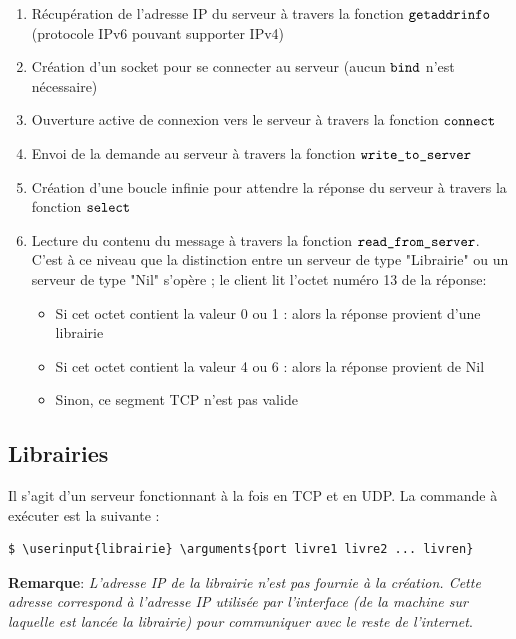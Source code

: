 \documentclass[
  french,
  twocolumn,
	9pt, %
]{fphw}
\newcommand\userinput[1]{\textbf{#1}}
\newcommand\arguments[1]{\textit{#1}}
\begin{document}
\begin{enumerate}
  \item Récupération de l'adresse IP du serveur à travers la fonction $\verb|getaddrinfo|$ (protocole IPv6 pouvant supporter IPv4)
  \item Création d'un socket pour se connecter au serveur (aucun $\verb|bind|$ n'est nécessaire) 
  \item Ouverture active de connexion vers le serveur à travers la fonction $\verb|connect|$
  \item Envoi de la demande au serveur à travers la fonction $\verb|write_to_server|$
  \item Création d'une boucle infinie pour attendre la réponse du serveur à travers la fonction $\verb|select|$
  \item Lecture du contenu du message à travers la fonction $\verb|read_from_server|$. C'est à ce niveau que la distinction entre un serveur de type "Librairie" ou un serveur de type "Nil" s'opère ; le client lit l'octet numéro 13 de la réponse:
  \begin{itemize}
    \item Si cet octet contient la valeur 0 ou 1 : alors la réponse provient d'une librairie
    \item Si cet octet contient la valeur 4 ou 6 : alors la réponse provient de Nil
    \item Sinon, ce segment TCP n'est pas valide
  \end{itemize}
\end{enumerate}


\subsection{Librairies}

Il s'agit d'un serveur fonctionnant à la fois en TCP et en UDP. La commande à exécuter est la suivante :
\begin{Verbatim}[commandchars=\\\{\}]
$ \userinput{librairie} \arguments{port livre1 livre2 ... livren}
\end{Verbatim}
\textbf{Remarque}: \textit{L'adresse IP de la librairie n'est pas fournie à la création. Cette adresse correspond à l'adresse IP utilisée par l'interface (de la machine sur laquelle est lancée la librairie) pour communiquer avec le reste de l'internet}.
\\
\end{document}
